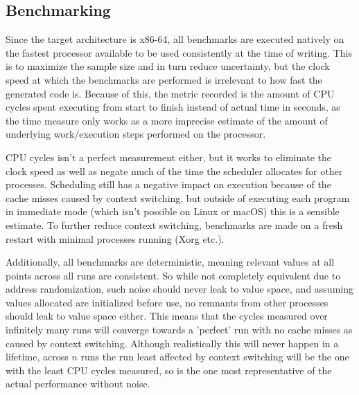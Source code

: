 \documentclass{article}
\begin{document}



\subsection{Benchmarking}


Since the target architecture is x86-64, all benchmarks are executed natively on the fastest processor available to be used consistently at the time of writing. This is to maximize the sample size and in turn reduce uncertainty, but the clock speed at which the benchmarks are performed is irrelevant to how fast the generated code is. Because of this, the metric recorded is the amount of CPU cycles spent executing from start to finish instead of actual time in seconds, as the time measure only works as a more imprecise estimate of the amount of underlying work/execution steps performed on the processor.

CPU cycles isn't a perfect measurement either, but it works to eliminate the clock speed as well as negate much of the time the scheduler allocates for other processes. Scheduling still has a negative impact on execution because of the cache misses caused by context switching, but outside of executing each program in immediate mode (which isn't possible on Linux or macOS) this is a sensible estimate. To further reduce context switching, benchmarks are made on a fresh restart with minimal processes running (Xorg etc.).

Additionally, all benchmarks are deterministic, meaning relevant values at all points across all runs are consistent.
So while not completely equivalent due to address randomization, such noise should never leak to value space, and assuming values allocated are initialized before use, no remnants from other processes should leak to value space either.  %
This means that the cycles measured over infinitely many runs will converge towards a 'perfect' run with no cache misses as caused by context switching.
Although realistically this will never happen in a lifetime, across \(n\) runs the run least affected by context switching will be the one with the least CPU cycles measured, so is the one most representative of the actual performance without noise.
\end{document}
